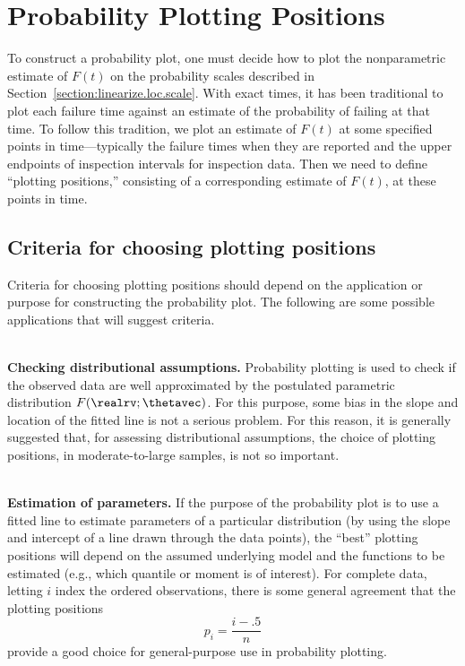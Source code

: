 \section{Probability Plotting Positions}
\label{section:plotting.pos}
To construct a probability plot, one must decide how to plot the
nonparametric estimate of $F(t)$ on the probability scales described
in Section~\ref{section:linearize.loc.scale}.  With exact times, it
has been traditional to plot each failure time against an estimate of
the probability of failing at that time.  To follow this tradition, we
plot an estimate of $F(t)$ at some specified points in
time---typically the failure times when they are reported and the
upper endpoints of inspection intervals for inspection data.  Then we
need to define ``plotting positions,'' consisting of a corresponding
estimate of $F(t)$, at these points in time.

\subsection{Criteria for choosing plotting positions}
\label{section:plotpos.criteria}
Criteria for choosing plotting positions should depend on the
application or purpose for constructing the probability plot. The
following are some possible applications that will suggest criteria.

\mbox{ }\\
\noindent
{\bf Checking distributional assumptions.}
Probability plotting is used to
check if the observed data are well approximated
by the postulated parametric distribution $F(\realrv; \thetavec)$.
For this purpose, some bias in the slope
and location of the fitted line is not a serious problem.
For this reason, it is generally suggested that, for assessing
distributional assumptions, the choice of plotting positions,
in moderate-to-large samples, is not so
important. 

\mbox{ }\\
\noindent
{\bf Estimation of parameters.}
If the purpose of the probability plot is to use a fitted line to
estimate parameters of a particular distribution
(by using the slope and intercept of a line drawn through
the data points), the ``best'' plotting positions will depend
on the assumed underlying model and the
functions to be estimated (e.g., which quantile or moment is of interest). 
For complete data, letting $i$ index the ordered observations, there is some
general agreement that the plotting positions
\begin{displaymath}
p_{i}=\frac{i-.5}{n}
\end{displaymath}
provide a good choice for general-purpose use in probability plotting.

